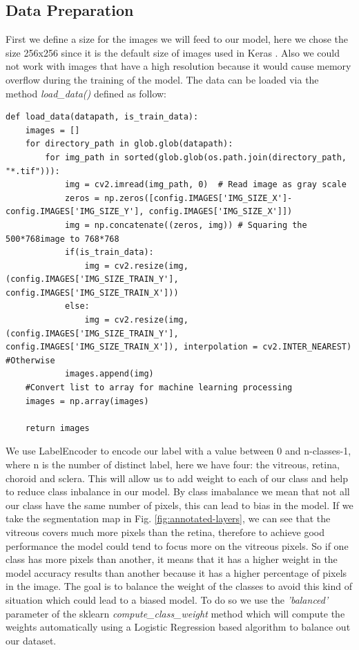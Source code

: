 \documentclass[12pt,a4paper]{scrartcl}
\begin{document}
\subsection{Data Preparation}\label{ss:datapreparation}
First we define a size for the images we will feed to our model, here we chose the size 256x256 since it is the default size of images used in Keras \cite{chollet2015keras}. Also we could not work with images that have a high resolution because it would cause memory overflow during the training of the model. The data can be loaded via the method \emph{load\_data()} defined as follow:
\begin{lstlisting}[caption=The method to load data can be found in the \emph{helper.py} file]
def load_data(datapath, is_train_data):
    images = []
    for directory_path in glob.glob(datapath):
        for img_path in sorted(glob.glob(os.path.join(directory_path, "*.tif"))):
            img = cv2.imread(img_path, 0)  # Read image as gray scale  
            zeros = np.zeros([config.IMAGES['IMG_SIZE_X']-config.IMAGES['IMG_SIZE_Y'], config.IMAGES['IMG_SIZE_X']]) 
            img = np.concatenate((zeros, img)) # Squaring the 500*768image to 768*768
            if(is_train_data):
                img = cv2.resize(img, (config.IMAGES['IMG_SIZE_TRAIN_Y'], config.IMAGES['IMG_SIZE_TRAIN_X']))
            else:
                img = cv2.resize(img, (config.IMAGES['IMG_SIZE_TRAIN_Y'], config.IMAGES['IMG_SIZE_TRAIN_X']), interpolation = cv2.INTER_NEAREST)  #Otherwise 
            images.append(img)
    #Convert list to array for machine learning processing        
    images = np.array(images)
    
    return images
\end{lstlisting}

We use LabelEncoder \cite{scikit-learn} to encode our label with a value between 0 and n-classes-1, where n is the number of distinct label, here we have four: the vitreous, retina, choroid and sclera. This will allow us to add weight to each of our class and help to reduce class inbalance in our model. By class imabalance we mean that not all our class have the same number of pixels, this can lead to bias in the model. If we take the segmentation map in Fig. \ref{fig:annotated-layers}, we can see that the vitreous covers much more pixels than the retina, therefore to achieve good performance the model could tend to focus more on the vitreous pixels. So if one class has more pixels than another, it means that it has a higher weight in the model accuracy results than another because it has a higher percentage of pixels in the image. The goal is to balance the weight of the classes to avoid this kind of situation which could lead to a biased model. To do so we use the \emph{'balanced'} parameter of the sklearn\cite{scikit-learn} \emph{compute\_class\_weight} method which will compute the weights automatically using a Logistic Regression based algorithm \cite{scikit-learn} to balance out our dataset. 
\end{document}
